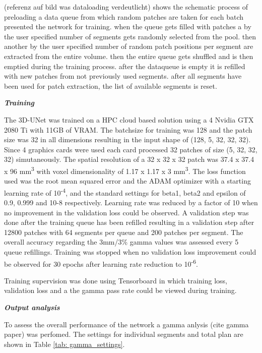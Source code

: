 (referenz auf bild was dataloading verdeutlicht) shows the schematic process of preloading a data queue from which random patches are taken for each batch presented the network for training. when the queue gets filled with patches a by the user specified number of segments gets randomly selected from the pool. then another by the user specified number of random patch positions per segment are extracted from the entire volume. then the entire queue gets shuffled and is then emptied during the training process. after the dataqueue is empty it is refilled with new patches from not previously used segments.
after all segments have been used for patch extraction, the list of available segments is reset.


\textbf{\emph{Training}}

The 3D-UNet was trained on a HPC cloud based solution using a 4 Nvidia GTX 2080 Ti with 11GB of VRAM. The batchsize for training was 128 and the patch size was 32 in all dimensions resulting in the input shape of (128, 5, 32, 32, 32). Since 4 graphics cards were used each card processed 32 patches of size (5, 32, 32, 32) simutaneously. The spatial resolution of a 32 x 32 x 32 patch was 37.4 x 37.4 x 96 mm\textsuperscript{3} with voxel dimensionality of 1.17 x 1.17 x 3 mm\textsuperscript{3}. 
The loss function used was the root mean squared error and the ADAM optimizer with a starting learning rate of 10\textsuperscript{-4}, and the standard settings for beta1, beta2 and epsilon of 0.9, 0.999 and 10-8 respectively. Learning rate was reduced by a factor of 10 when no improvement in the validation loss could be observed. 
A validation step was done after the training queue has been refilled resulting in a validation step after 12800 patches with 64 segments per queue and 200 patches per segment. The overall accuracy regarding the 3mm/3\% gamma values was assessed every 5 queue refillings. Training was stopped when no validation loss improvement could be observed for 30 epochs after learning rate reduction to 10\textsuperscript{-6}.

Training supervision was done using Tensorboard in which training loss, validation loss and a the gamma pass rate could be viewed during training. 


\textbf{\emph{Output analysis}}

To assess the overall performance of the network a gamma anlysis (cite gamma paper) was perfomed. The settings for individual segments and total plan are shown in Table \ref{tab: gamma_settings}.  

